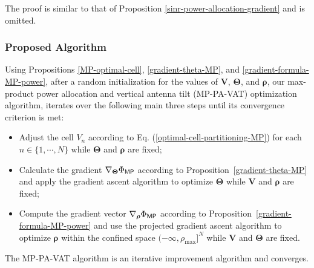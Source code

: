 \noindent The proof is similar to that of Proposition \ref{sinr-power-allocation-gradient} and is omitted.



\subsubsection{Proposed Algorithm}\label{MP-Algorithm}

Using Propositions \ref{MP-optimal-cell}, \ref{gradient-theta-MP}, and \ref{gradient-formula-MP-power}, %
after a random initialization for the values of $\bm{V}$, $\bm{\Theta}$, and $\bm{\rho}$, our %
max-product power allocation and vertical antenna tilt (MP-PA-VAT) optimization algorithm, iterates over the following main three steps until its convergence criterion is met: 
\begin{itemize}
    \item Adjust the cell $V_n$ according to Eq. (\ref{optimal-cell-partitioning-MP}) for each $n \in \{1, \cdots, N\}$ while $\bm{\Theta}$ and $\bm{\rho}$ are fixed;
    \item Calculate the gradient $\nabla_{\bm{\Theta}}\Phi_{{\sf MP}}$ according to Proposition~\ref{gradient-theta-MP} and apply the gradient ascent algorithm to optimize $\bm{\Theta}$ while $\bm{V}$ and $\bm{\rho}$ are fixed;
    \item Compute the gradient vector $\nabla_{\bm{\rho}}\Phi_{{\sf MP}}$ according to Proposition~\ref{gradient-formula-MP-power} and use the projected gradient ascent algorithm to optimize $\bm{\rho}$ within the confined space $(-\infty, \rho_{\max}]^N$ while $\bm{V}$ and $\bm{\Theta}$ are fixed.
\end{itemize}


\begin{Proposition}\label{MP-PA-VAT-convergence}
    The MP-PA-VAT algorithm is an iterative improvement algorithm and converges.
\end{Proposition}

